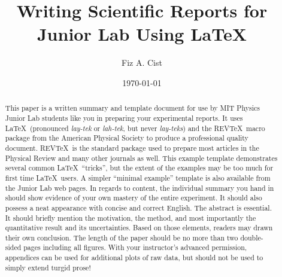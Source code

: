 \usepackage{graphicx}      %
\usepackage{bm}            %
\usepackage[colorlinks=true]{hyperref}  %




\title{Writing Scientific Reports for Junior Lab Using \LaTeX}
\author{Fiz A. Cist}
\date{\today}


\begin{abstract}
This paper is a written summary and template document for use by
 MIT Physics Junior Lab students like you in preparing your 
experimental reports. It uses \LaTeX\ (pronounced \emph{lay-tek} 
or \emph{lah-tek}, but never \emph{lay-teks}) and the REV\TeX\ macro 
package from the American Physical Society to produce a 
professional quality document.  REV\TeX\ is the standard package 
used to prepare most articles in the Physical Review and  
many other journals as well. 
This example template demonstrates several common 
\LaTeX\ ``tricks'', but the extent of the examples may be too much 
for first time \LaTeX\ users. A simpler ``minimal example'' template 
is also available from the Junior Lab web pages.
 In regards to content, the individual summary you hand in should 
show evidence of your own mastery of the entire experiment. It should 
also possess a neat appearance with concise  and correct English.  The abstract 
is essential. It should briefly mention the motivation, the method, and 
most importantly the quantitative result and its uncertainties.  Based on
those elements, readers may drawn their own conclusion.  The 
length of the paper should be no more than two double-sided pages
 including all figures.  With your instructor's advanced permission, 
appendices can be used for additional plots of raw data, but should 
not be used to simply extend turgid prose!
\end{abstract}

